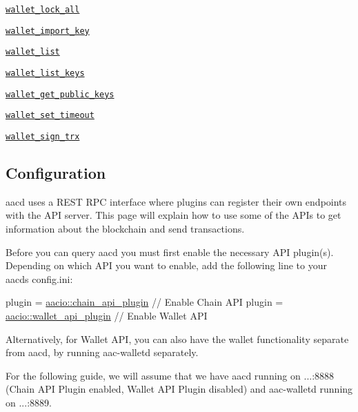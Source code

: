 \begin{DoxyItemize}
\begin{DoxyItemize}
\item \href{#v1walletlockall}{\tt wallet\+\_\+lock\+\_\+all}
\item \href{#v1walletimportkey}{\tt wallet\+\_\+import\+\_\+key}
\item \href{#v1walletlist}{\tt wallet\+\_\+list}
\item \href{#v1walletlistkeys}{\tt wallet\+\_\+list\+\_\+keys}
\item \href{#v1walletgetpublickeys}{\tt wallet\+\_\+get\+\_\+public\+\_\+keys}
\item \href{#v1walletsettimeout}{\tt wallet\+\_\+set\+\_\+timeout}
\item \href{#v1walletsigntrx}{\tt wallet\+\_\+sign\+\_\+trx}
\end{DoxyItemize}
\end{DoxyItemize}\hypertarget{group__aaciorpc_configuration}{}\subsection{Configuration}\label{group__aaciorpc_configuration}
{\ttfamily aacd} uses a R\+E\+ST R\+PC interface where plugins can register their own endpoints with the A\+PI server. This page will explain how to use some of the A\+P\+Is to get information about the blockchain and send transactions.

Before you can query {\ttfamily aacd} you must first enable the necessary A\+PI plugin(s). Depending on which A\+PI you want to enable, add the following line to your {\ttfamily aacd}\textquotesingle{}s {\ttfamily config.\+ini}\+: 
\begin{DoxyCode}
plugin = \mbox{\hyperlink{classaacio_1_1chain__api__plugin}{aacio::chain\_api\_plugin}} \textcolor{comment}{// Enable Chain API}
plugin = \mbox{\hyperlink{classaacio_1_1wallet__api__plugin}{aacio::wallet\_api\_plugin}} \textcolor{comment}{// Enable Wallet API}
\end{DoxyCode}
 Alternatively, for Wallet A\+PI, you can also have the wallet functionality separate from {\ttfamily aacd}, by running {\ttfamily aac-\/walletd} separately.

For the following guide, we will assume that we have {\ttfamily aacd} running on {...\+:8888} (Chain A\+PI Plugin enabled, Wallet A\+PI Plugin disabled) and {\ttfamily aac-\/walletd} running on {...\+:8889}. 

